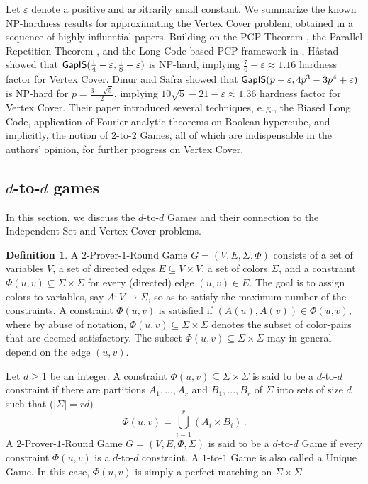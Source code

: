 \documentclass[11pt]{article}
\numberwithin{equation}{section}
\theoremstyle{definition}
\newtheorem{definition}[theorem]{Definition}
\theoremstyle{plain}
\newcommand{\eg}{e.\,g.}
\newcommand\eps{\varepsilon}
\begin{document}
Let $\eps$ denote a positive and arbitrarily small constant. We summarize the known
 NP-hardness results for approximating the Vertex Cover problem, obtained in a sequence of
 highly influential papers.
 Building on the
PCP Theorem \cite{FGLSS96, AS98, ALMSS98}, the Parallel Repetition Theorem \cite{Raz98}, and the
Long Code based PCP framework in \cite{BGS}, H\aa stad \cite{Has99} showed that ${\sf GapIS}(\frac{1}{4}-\eps,\frac{1}{8}+\eps)$
is NP-hard, implying $\frac{7}{6}-\eps \approx 1.16$ hardness factor for Vertex Cover.
Dinur and Safra
\cite{DS05}  showed that ${\sf GapIS}(p-\eps, 4p^3-3p^4+\eps)$ is NP-hard for $p = \frac{3-\sqrt{5}}{2}$, implying
$10 \sqrt{5} - 21 - \eps \approx 1.36$ hardness factor for Vertex Cover. Their paper introduced several techniques, \eg, the
Biased Long Code, application of Fourier analytic theorems on Boolean hypercube, and implicitly, the notion of  $2$-to-$2$ Games,
all of which are indispensable in the authors' opinion, for further progress on Vertex Cover.


\subsection{\texorpdfstring{$d$-to-$d$}{s-to-d} games}


In this section, we discuss the $d$-to-$d$ Games and their connection to the Independent Set and
Vertex Cover problems.


\begin{definition}\label{def:game}
A $2$-Prover-$1$-Round Game $G=(V,E,\Sigma,\Phi)$ consists of a set of variables $V$, a set of directed edges
$E\subseteq V\times V$, a set of colors $\Sigma$, and
a constraint $\Phi(u,v)\subseteq \Sigma\times \Sigma$ for every (directed) edge $(u,v) \in E$. The goal is to assign colors to variables, say
 $A: V \to \Sigma$, so as to satisfy the maximum number of the constraints. A constraint $\Phi(u,v)$
is satisfied if $ (A(u), A(v)) \in \Phi(u,v)$, where by abuse of notation, $\Phi(u,v) \subseteq \Sigma
\times \Sigma$ denotes the subset of color-pairs that are deemed satisfactory. The subset  $\Phi(u,v) \subseteq \Sigma \times \Sigma$
may in general depend on the edge $(u,v)$.

Let $d \geqslant 1$ be an integer. A constraint $\Phi(u,v) \subseteq \Sigma \times \Sigma$ is said to be a $d$-to-$d$ constraint if
there are partitions
$A_1,...,A_r$ and  $B_1,...,B_r$ of $\Sigma$ into sets of size $d$  such that ($|\Sigma| = rd$)
\[
\Phi(u,v)=\bigcup\limits_{i=1}^r{(A_i\times B_i)}\,.%
\]
A $2$-Prover-$1$-Round Game $G=(V,E,\Phi,\Sigma)$ is said to be a $d$-to-$d$ Game if every constraint $\Phi(u,v)$ is a $d$-to-$d$ constraint.
A $1$-to-$1$ Game is also called a Unique Game. In this case, $\Phi(u,v)$ is simply a perfect matching on $\Sigma \times \Sigma$.
%
%
\end{definition}
\end{document}
